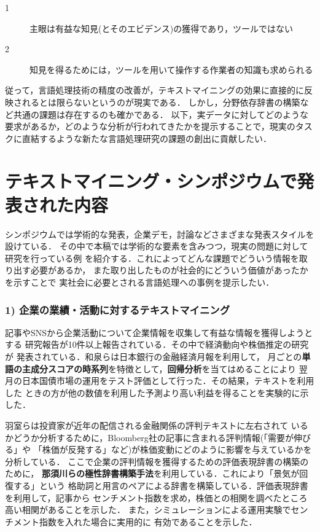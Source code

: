 \documentclass[twocolumn]{jarticle}
\begin{document}
\begin{description}
\item[1] 主眼は有益な知見(とそのエビデンス)の獲得であり，ツールではない
\item[2] 知見を得るためには，ツールを用いて操作する作業者の知識も求められる
\end{description}

従って，言語処理技術の精度の改善が，テキストマイニングの効果に直接的に反映されるとは限らないというのが現実である．
しかし，分野依存辞書の構築\cite{nasukawa04}など共通の課題は存在するのも確かである．
以下，実データに対してどのような要求があるか，どのような分析が行われてきたかを提示することで，現実のタスクに直結するような新たな言語処理研究の課題の創出に貢献したい．


\section{テキストマイニング・シンポジウムで発表された内容}
シンポジウムでは学術的な発表，企業デモ，討論などさまざまな発表スタイルを設けている．
その中で本稿では学術的な要素を含みつつ，現実の問題に対して研究を行っている例
を紹介する．これによってどんな課題でどういう情報を取り出す必要があるか，
また取り出したものが社会的にどういう価値があったかを示すことで
実社会に必要とされる言語処理への事例を提示したい．

\subsubsection*{1) 企業の業績・活動に対するテキストマイニング}
記事やSNSから企業活動について企業情報を収集して有益な情報を獲得しようとする
研究報告が10件以上報告されている．その中で経済動向や株価推定の研究が
発表されている．和泉ら\cite{izumi2011}は日本銀行の金融経済月報を利用して，
月ごとの{\bf 単語の主成分スコアの時系列}を特徴として，{\bf 回帰分析}を当てはめることにより
翌月の日本国債市場の運用をテスト評価として行った．その結果，テキストを利用した
ときの方が他の数値を利用した予測より高い利益を得ることを実験的に示した．

羽室ら\cite{hamuro2011}は投資家が近年の配信される金融関係の評判テキストに左右されて
いるかどうか分析するために，Bloomberg社の記事に含まれる評判情報(「需要が伸びる」や
「株価が反発する」など)が株価変動にどのように影響を与えているかを分析している．
ここで企業の評判情報を獲得するための評価表現辞書の構築のために，
{\bf 那須川ら\cite{nasukawa04}の極性辞書構築手法}を利用している．これにより「景気が回復する」という
格助詞と用言のペアによる辞書を構築している．評価表現辞書を利用して，記事から
センチメント指数を求め，株価との相関を調べたところ高い相関があることを示した．
また，シミュレーションによる運用実験でセンチメント指数を入れた場合に実用的に
有効であることを示した．
\end{document}
